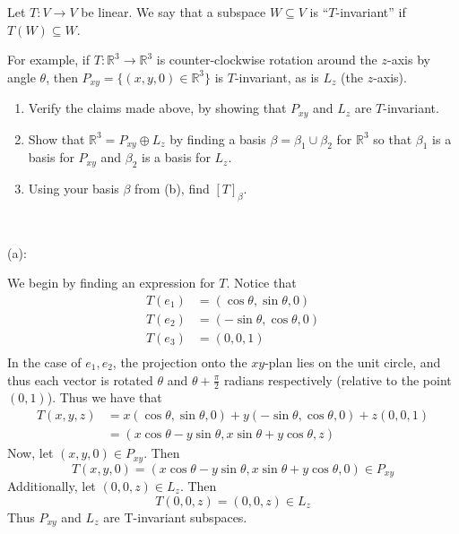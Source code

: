 \documentclass{eh-homework}
\begin{document}
    \begin{question}{11}
        Let \( T : V \to V \) be linear. We say that a subspace \( W \subseteq V \) is ``\( T \)-invariant'' if \( T(W) \subseteq W \).

        For example, if \( T : \mathbb{R}^3 \to \mathbb{R}^3 \) is counter-clockwise rotation around the \( z \)-axis by angle \( \theta \), then \( P_{xy} = \{(x, y, 0) \in \mathbb{R}^3\} \) is \( T \)-invariant, as is \( L_z \) (the \( z \)-axis).

        \begin{enumerate}[label=(\alph*)]
            \item Verify the claims made above, by showing that \( P_{xy} \) and \( L_z \) are \( T \)-invariant.
            \item Show that \( \mathbb{R}^3 = P_{xy} \oplus L_z \) by finding a basis \( \beta = \beta_1 \cup \beta_2 \) for \( \mathbb{R}^3 \) so that \( \beta_1 \) is a basis for \( P_{xy} \) and \( \beta_2 \) is a basis for \( L_z \).
            \item Using your basis \( \beta \) from (b), find \( [T]_\beta \).
        \end{enumerate}
        \tcblower
        \ 

        (a):

        We begin by finding an expression for \(T\). Notice that
        \begin{align*}
            T(e_1) &= (\cos \theta , \sin \theta , 0) \\
            T(e_2) &= (-\sin \theta, \cos \theta, 0) \\
            T(e_3) &= (0,0,1) \\
        \end{align*}
        In the case of \(e_1, e_2\), the projection onto the \(xy\)-plan lies on the unit circle, and thus each vector is rotated \(\theta\) and \(\theta + \frac{\pi}{2}\) radians respectively (relative to the point \((0,1)\)). Thus we have that
        \begin{align*}
            T(x,y,z) &= x(\cos \theta , \sin \theta , 0) + y(-\sin \theta , \cos \theta , 0) + z(0,0,1) \\
            &= (x\cos \theta - y\sin \theta , x\sin \theta +y\cos \theta , z)
        \end{align*}
        Now, let \((x,y,0) \in P_{xy}\). Then
        \[
            T(x,y,0) = (x \cos \theta - y\sin \theta , x\sin \theta + y\cos \theta , 0) \in P_{xy}
        \]
        Additionally, let \((0,0,z) \in L_z\). Then
        \[
            T(0,0,z) = (0,0,z) \in L_z
        \]
        Thus \(P_{xy}\) and \(L_z\) are T-invariant subspaces.


\end{question}
\end{document}
